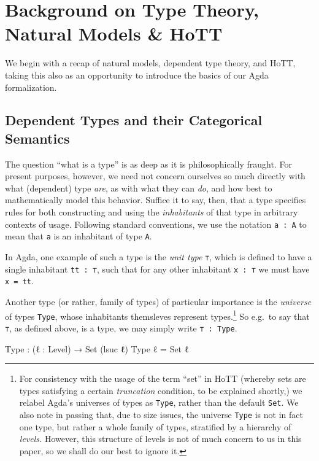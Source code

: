 \documentclass[
  11pt,
  oneside,
  article]{memoir}
\newenvironment{Shaded}{}{}
\newcommand{\DataTypeTok}[1]{\textcolor[rgb]{0.56,0.13,0.00}{#1}}
\newcommand{\NormalTok}[1]{#1}
\newcommand{\OtherTok}[1]{\textcolor[rgb]{0.00,0.44,0.13}{#1}}
\theoremstyle{definition}
\theoremstyle{plain}
\newcommand{\0}{\textsf{0}}
\newcommand{\1}{\tn{\textsf{1}}}
\begin{document}
\chapter{Background on Type Theory, Natural Models \&
HoTT}\label{background-on-type-theory-natural-models-hott}

We begin with a recap of natural models, dependent type theory, and
HoTT, taking this also as an opportunity to introduce the basics of our
Agda formalization.

\section{Dependent Types and their Categorical
Semantics}\label{dependent-types-and-their-categorical-semantics}

The question ``what is a type'' is as deep as it is philosophically
fraught. For present purposes, however, we need not concern ourselves so
much directly with what (dependent) type \emph{are}, as with what they
can \emph{do}, and how best to mathematically model this behavior.
Suffice it to say, then, that a type specifies rules for both
constructing and using the \emph{inhabitants} of that type in arbitrary
contexts of usage. Following standard conventions, we use the notation
\texttt{a\ :\ A} to mean that \texttt{a} is an inhabitant of type
\texttt{A}.

In Agda, one example of such a type is the \emph{unit type} \texttt{⊤},
which is defined to have a single inhabitant \texttt{tt\ :\ ⊤}, such
that for any other inhabitant \texttt{x\ :\ ⊤} we must have
\texttt{x\ =\ tt}.

Another type (or rather, family of types) of particular importance is
the \emph{universe} of types \texttt{Type}, whose inhabitants themsleves
represent types.\footnote{For consistency with the usage of the term
  ``set'' in HoTT (whereby sets are types satisfying a certain
  \emph{truncation} condition, to be explained shortly,) we relabel
  Agda's universes of types as \texttt{Type}, rather than the default
  \texttt{Set}. We also note in passing that, due to size issues, the
  universe \texttt{Type} is not in fact one type, but rather a whole
  family of types, stratified by a hierarchy of \emph{levels.} However,
  this structure of levels is not of much concern to us in this paper,
  so we shall do our best to ignore it.} So e.g.~to say that \texttt{⊤},
as defined above, is a type, we may simply write \texttt{⊤\ :\ Type}.

\begin{Shaded}
\begin{Highlighting}[]
\NormalTok{Type }\OtherTok{:} \OtherTok{(}\NormalTok{ℓ }\OtherTok{:}\NormalTok{ Level}\OtherTok{)} \OtherTok{→} \DataTypeTok{Set} \OtherTok{(}\NormalTok{lsuc ℓ}\OtherTok{)}
\NormalTok{Type ℓ }\OtherTok{=} \DataTypeTok{Set}\NormalTok{ ℓ}
\end{Highlighting}
\end{Shaded}
\end{document}
